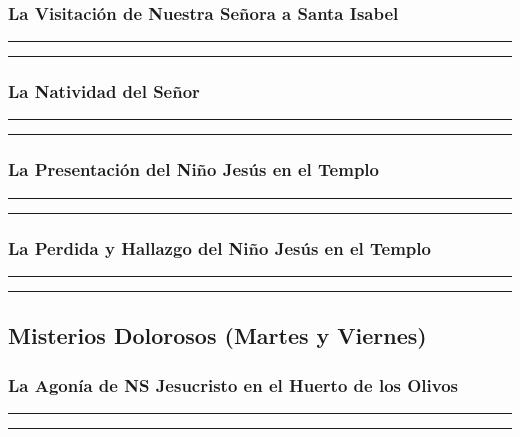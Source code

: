 \documentclass[11pt,a4paper]{report}
\begin{document}
    \subsubsection*{La Visitación de Nuestra Señora a Santa Isabel}
    
    
    \rule{\textwidth}{0.5pt}
    
    \rule{\textwidth}{0.5pt}
    

    \subsubsection*{La Natividad del Señor}
    
    
    \rule{\textwidth}{0.5pt}
    
    \rule{\textwidth}{0.5pt}
    

    \subsubsection*{La Presentación del Niño Jesús en el Templo}
    
    
    \rule{\textwidth}{0.5pt}
    
    \rule{\textwidth}{0.5pt}
    

    \subsubsection*{La Perdida y Hallazgo del Niño Jesús en el Templo}
    
    
    \rule{\textwidth}{0.5pt}
    
    \rule{\textwidth}{0.5pt}
    

    

    \subsection*{Misterios Dolorosos (Martes y Viernes)}

    \subsubsection*{La Agonía de NS Jesucristo en el Huerto de los Olivos}
    
    
    \rule{\textwidth}{0.5pt}
    
    \rule{\textwidth}{0.5pt}
    
\end{document}
